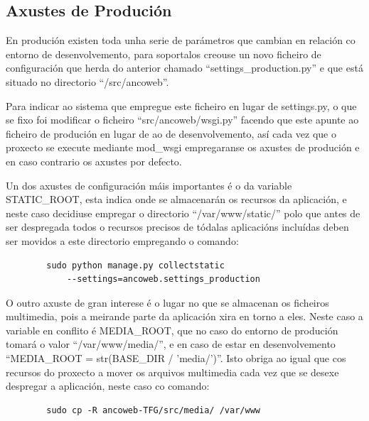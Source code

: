     \subsection{Axustes de Produción}
        En produción existen toda unha serie de parámetros que cambian en relación co entorno de 
        desenvolvemento, para soportalos creouse un novo ficheiro de configuración que herda do 
        anterior chamado ``settings\_production.py'' e que está situado no directorio 
        ``/src/ancoweb''.
        
        Para indicar ao sistema que empregue este ficheiro en lugar de settings.py, o que se fixo 
        foi modificar o ficheiro ``src/ancoweb/wsgi.py'' facendo que este apunte ao ficheiro de 
        produción en lugar de ao de desenvolvemento, así cada vez que o proxecto se execute mediante
        mod\_wsgi empregaranse os axustes de produción e en caso contrario os axustes por defecto.
        
        Un dos axustes de configuración máis importantes é o da variable STATIC\_ROOT, esta indica
        onde se almacenarán os recursos da aplicación, e neste caso decidiuse empregar o directorio
        ``/var/www/static/'' polo que antes de ser despregada todos o recursos precisos de tódalas 
        aplicacións incluídas deben ser movidos a este directorio empregando o comando:
        
        \begin{verbatim}
        sudo python manage.py collectstatic 
            --settings=ancoweb.settings_production
        \end{verbatim}

        O outro axuste de gran interese é o lugar no que se almacenan os ficheiros multimedia, pois
        a meirande parte da aplicación xira en torno a eles. Neste caso a variable en conflito é 
        MEDIA\_ROOT, que no caso do entorno de produción tomará o valor ``/var/www/media/'', e en 
        caso de estar en desenvolvemento ``MEDIA\_ROOT = str(BASE\_DIR / 'media/')''. Isto obriga ao 
        igual que cos recursos do proxecto a mover os arquivos multimedia cada vez que se desexe 
        despregar a aplicación, neste caso co comando:
        
        \begin{verbatim}
        sudo cp -R ancoweb-TFG/src/media/ /var/www
        \end{verbatim}
